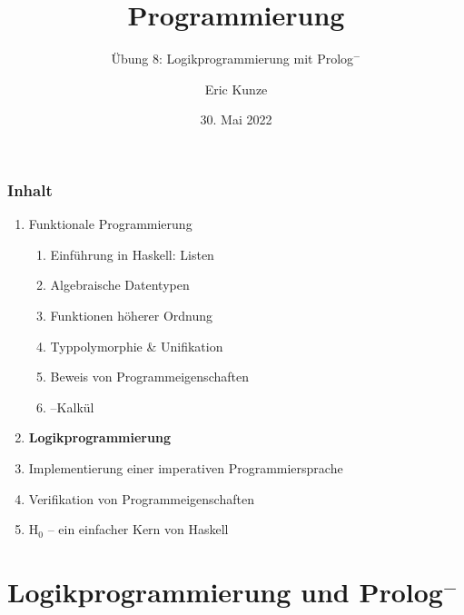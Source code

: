 \documentclass{beamer}
\begin{document}
	
	\title{Programmierung}
	\subtitle{Übung 8: Logikprogrammierung mit Prolog${}^-$}
	\author{Eric Kunze}
	\date{30. Mai 2022}
	
	\maketitle
	


\begin{frame}[fragile] \frametitle{Inhalt}
	\begin{enumerate}
		\item Funktionale Programmierung
		\begin{enumerate}
			\item Einführung in Haskell: Listen
			\item Algebraische Datentypen
			\item Funktionen höherer Ordnung
			\item Typpolymorphie \& Unifikation
			\item Beweis von Programmeigenschaften
			\item \textlambda--Kalkül
		\end{enumerate}
		\item \textbf{Logikprogrammierung}
		\item Implementierung einer imperativen Programmiersprache
		\item Verifikation von Programmeigenschaften
		\item H${}_\text{0}$ -- ein einfacher Kern von Haskell
	\end{enumerate}
\end{frame}


\section{Logikprogrammierung und Prolog${}^-$}
\end{document}
